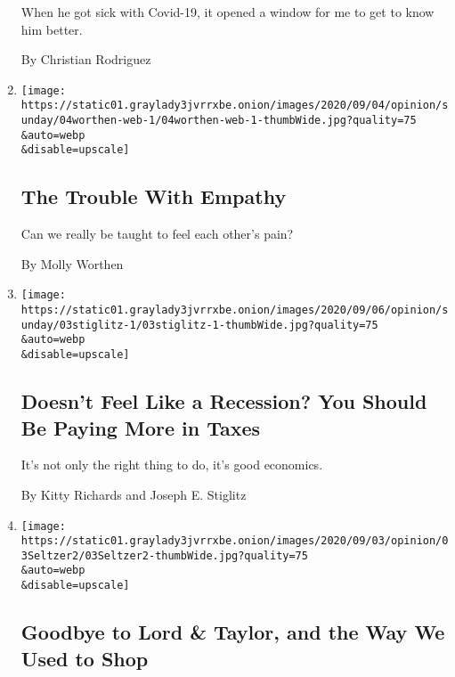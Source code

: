 \begin{enumerate}
  When he got sick with Covid-19, it opened a window for me to get to
  know him better.

  By Christian Rodriguez
\item
  \href{/2020/09/04/opinion/sunday/empathy-school-college.html}{}

  \texttt{[image: https://static01.graylady3jvrrxbe.onion/images/2020/09/04/opinion/sunday/04worthen-web-1/04worthen-web-1-thumbWide.jpg?quality=75\\\&auto=webp\\\&disable=upscale]}

  \hypertarget{the-trouble-with-empathy}{%
  \subsection{The Trouble With Empathy}\label{the-trouble-with-empathy}}

  Can we really be taught to feel each other's pain?

  By Molly Worthen
\item
  \href{/2020/09/03/opinion/sunday/progressive-policies-taxes.html}{}

  \texttt{[image: https://static01.graylady3jvrrxbe.onion/images/2020/09/06/opinion/sunday/03stiglitz-1/03stiglitz-1-thumbWide.jpg?quality=75\\\&auto=webp\\\&disable=upscale]}

  \hypertarget{doesnt-feel-like-a-recession-you-should-be-paying-more-in-taxes}{%
  \subsection{Doesn't Feel Like a Recession? You Should Be Paying More
  in
  Taxes}\label{doesnt-feel-like-a-recession-you-should-be-paying-more-in-taxes}}

  It's not only the right thing to do, it's good economics.

  By Kitty Richards and Joseph E. Stiglitz
\item
  \href{/2020/09/03/opinion/sunday/lord-taylor-closed.html}{}

  \texttt{[image: https://static01.graylady3jvrrxbe.onion/images/2020/09/03/opinion/03Seltzer2/03Seltzer2-thumbWide.jpg?quality=75\\\&auto=webp\\\&disable=upscale]}

  \hypertarget{goodbye-to-lord--taylor-and-the-way-we-used-to-shop}{%
  \subsection{Goodbye to Lord \& Taylor, and the Way We Used to
  Shop}\label{goodbye-to-lord--taylor-and-the-way-we-used-to-shop}}


\end{enumerate}
